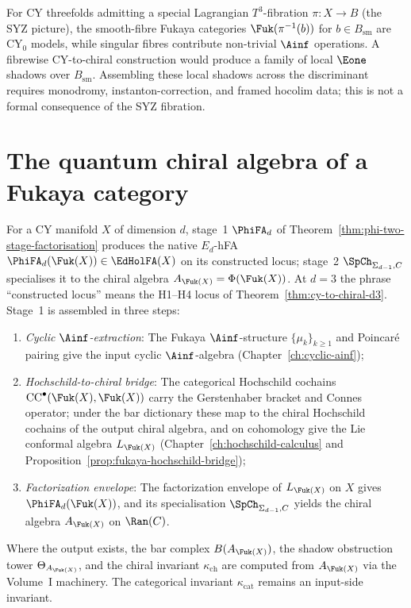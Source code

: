 \begin{remark}
\label{rem:syz-chiral}
For CY threefolds admitting a special Lagrangian $T^3$-fibration
$\pi \colon X \to B$ (the SYZ picture), the smooth-fibre Fukaya
categories $\Fuk(\pi^{-1}(b))$ for $b \in B_{\mathrm{sm}}$ are
CY$_0$ models, while singular fibres contribute non-trivial
$\Ainf$ operations. A fibrewise CY-to-chiral construction would
produce a family of local $\Eone$ shadows over $B_{\mathrm{sm}}$.
Assembling these local shadows across the discriminant requires
monodromy, instanton-correction, and framed hocolim data; this is not
a formal consequence of the SYZ fibration.
\end{remark}


\section{The quantum chiral algebra of a Fukaya category}
\label{sec:fukaya-qca}

\begin{construction}
\label{constr:fukaya-phi}
For a CY manifold $X$ of dimension $d$, stage~1 $\PhiFA_d$ of
Theorem~\ref{thm:phi-two-stage-factorisation} produces the native
$E_d$-hFA $\PhiFA_d(\Fuk(X)) \in \EdHolFA(X)$ on its constructed
locus; stage~2 $\SpCh_{\Sigma_{d-1}, C}$ specialises it to the
chiral algebra $A_{\Fuk(X)} = \Phi(\Fuk(X))$. At $d = 3$ the phrase
``constructed locus'' means the H1--H4 locus of
Theorem~\ref{thm:cy-to-chiral-d3}. Stage~1 is assembled in three
steps:
\begin{enumerate}[label=\arabic*.]
 \item \emph{Cyclic $\Ainf$-extraction}: The Fukaya $\Ainf$-structure
 $\{\mu_k\}_{k \geq 1}$ and Poincar\'{e} pairing give the input
 cyclic $\Ainf$-algebra (Chapter~\ref{ch:cyclic-ainf});
 \item \emph{Hochschild-to-chiral bridge}: The categorical Hochschild
 cochains $\mathrm{CC}^\bullet(\Fuk(X), \Fuk(X))$ carry the
 Gerstenhaber bracket and Connes operator; under the bar dictionary
 these map to the chiral Hochschild cochains of the output chiral
 algebra, and on cohomology give the Lie conformal algebra
 $L_{\Fuk(X)}$ (Chapter~\ref{ch:hochschild-calculus} and
 Proposition~\ref{prop:fukaya-hochschild-bridge});
 \item \emph{Factorization envelope}: The factorization envelope
 of $L_{\Fuk(X)}$ on $X$ gives $\PhiFA_d(\Fuk(X))$, and its
 specialisation $\SpCh_{\Sigma_{d-1}, C}$ yields the chiral algebra
 $A_{\Fuk(X)}$ on $\Ran(C)$.
\end{enumerate}
Where the output exists, the bar complex $B(A_{\Fuk(X)})$, the
shadow obstruction tower $\Theta_{A_{\Fuk(X)}}$, and the chiral
invariant $\kappa_{\mathrm{ch}}$ are computed from
$A_{\Fuk(X)}$ via the Volume~I machinery. The categorical invariant
$\kappa_{\mathrm{cat}}$ remains an input-side invariant.
\end{construction}

